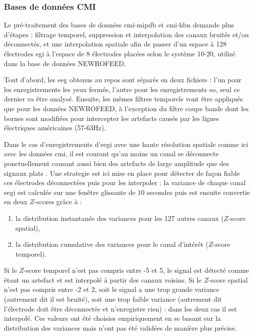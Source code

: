 \subsubsection{Bases de données CMI} \label{treatment_cmi_databases}

Le pré-traitement des bases de données \gls{cmi-mipdb} et \gls{cmi-hbn} demande plus d'étapes : filtrage temporel, suppression et 
interpolation des canaux bruités et/ou déconnectés, et une interpolation spatiale afin de passer d'un espace à 128 électrodes \gls{egi}
à l'espace de 8 électrodes placées selon le système 10-20, utilisé dans la base de données NEWROFEED.

Tout d'abord, les \gls{eeg} obtenus au repos sont séparés en deux fichiers : l'un pour les enregistrements les yeux fermés, 
l'autre pour les enregistrements \gls{eo}, seul ce dernier va être analysé. Ensuite, les mêmes filtres temporels vont être appliqués
que pour les données NEWROFEED, à l'exception du filtre coupe bande dont les bornes sont modifiées pour intercepter les artefacts 
causés par les lignes électriques américaines (57-63Hz).

Dans le cas d'enregistrements d'\gls{eegi} avec une haute résolution spatiale comme ici avec les données \gls{cmi}, 
il est courant qu'au moins un canal se déconnecte ponctuellement causant aussi bien des artefacts de large amplitude que des signaux plats \citep{Barlow1986, Oregan2013}. 
Une strategie est ici mise en place pour détecter de façon fiable ces électrodes déconnectées puis pour les interpoler : la variance de chaque canal 
\gls{eegi} est calculée sur une fenêtre glissante de 10 secondes puis est ensuite convertie en deux $Z$-scores grâce à :
\begin{enumerate}
\item la distribution instantanée des variances pour les 127 autres canaux ($Z$-score spatial),
\item la distribution cumulative des variances pour le canal d'intérêt ($Z$-score temporel).
\end{enumerate}
Si le $Z$-score temporel n'est pas compris entre -5 et 5, le signal est détecté comme étant un artefact et est interpolé à partir des canaux voisins.
Si le $Z$-score spatial n'est pas compris entre -2 et 2, soit le signal a une trop grande variance (autrement dit il est bruité), soit une trop faible
variance (autrement dit l'électrode doit être déconnectée et n'enregistre rien) : dans les deux cas il est interpolé. Ces valeurs ont été choisies
empiriquement en se basant sur la distribution des variances mais n'ont pas été validées de manière plus précise.  


